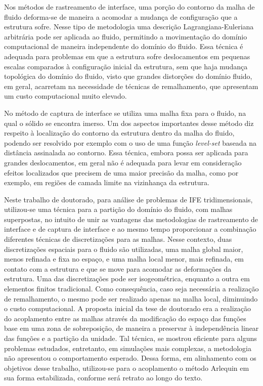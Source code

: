 \documentclass[tese_patricia.tex]{subfiles}
\begin{document}
Nos métodos de rastreamento de interface, uma porção do contorno da malha de fluido deforma-se de maneira a acomodar a mudança de configuração que a estrutura sofre. Nesse tipo de metodologia uma descrição Lagrangiana-Euleriana arbitrária pode ser aplicada ao fluido, permitindo a movimentação do domínio computacional de maneira independente do domínio do fluido. Essa técnica é adequada para problemas em que a estrutura sofre deslocamentos em pequenas escalas comparados à configuração inicial da estrutura, sem que haja mudança topológica do domínio do fluido, visto que grandes distorções do domínio fluido, em geral, acarretam na necessidade de técnicas de remalhamento, que apresentam um custo computacional muito elevado.

No método de captura de interface se utiliza uma malha fixa para o fluido, na qual o sólido se encontra imerso. Um dos aspectos importantes desse método diz respeito à localização do contorno da estrutura dentro da malha do fluido, podendo ser resolvido por exemplo com o uso de uma função \textit{level-set} baseada na distância assinalada ao contorno. Essa técnica, embora possa ser aplicada para grandes deslocamentos, em geral não é adequada para levar em consideração efeitos localizados que precisem de uma maior precisão da malha, como por exemplo, em regiões de camada limite na vizinhança da estrutura. 

Neste trabalho de doutorado, para análise de problemas de IFE tridimensionais, utilizou-se uma técnica para a partição do domínio do fluido, com malhas superpostas, no intuito de unir as vantagens das metodologias de rastreamento de interface e de captura de interface e ao mesmo tempo proporcionar a combinação diferentes técnicas de discretizações para as malhas. Nesse contexto, duas discretizações espaciais para o fluido são utilizadas, uma malha global maior, menos refinada e fixa no espaço, e uma malha local menor, mais refinada, em contato com a estrutura e que se move para acomodar as deformações da estrutura. Uma das discretizações pode ser isogeométrica, enquanto a outra em elementos finitos tradicional. Como consequência, caso seja necessária a realização de remalhamento, o mesmo pode ser realizado apenas na malha local, diminuindo o custo computacional. A proposta inicial da tese de doutorado era a realização do acoplamento entre as malhas através da modificação do espaço das funções base em uma zona de sobreposição, de maneira a preservar à independência linear das funções e a partição da unidade. Tal técnica, se mostrou eficiente para alguns problemas estudados, entretanto, em simulações mais complexas, a metodologia não apresentou o comportamento esperado. Dessa forma, em alinhamento com os objetivos desse trabalho, utilizou-se para o acoplamento o método Arlequin em sua forma estabilizada, conforme será retrato ao longo do texto. 
\end{document}
